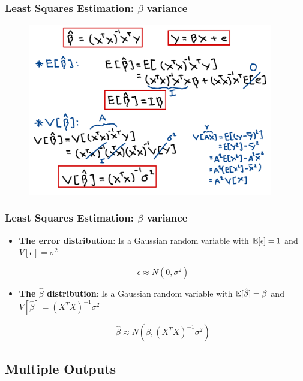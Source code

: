 \begin{frame}
    \frametitle{Least Squares Estimation: $\beta$ variance}
    \begin{figure}
        \centering
        \includegraphics[width=0.95\textwidth]{sections/least_squares_estimation/figures/beta_variance_prove.pdf}
    \end{figure}
\end{frame}


\begin{frame}
    \frametitle{Least Squares Estimation: $\beta$ variance}

    \begin{itemize}

        \item \textbf{The error distribution}: Is a Gaussian random variable with
        $\operatorname*{\mathbb{E}}[\epsilon]=1$ and $V[\epsilon]=\sigma^2$

        $$\epsilon \approx N(0, \sigma^2)$$

        \item \textbf{The  $\hat{\beta}$ distribution}: Is a Gaussian random variable
        with $\operatorname*{\mathbb{E}}[\hat{\beta}]=\beta$ and $V[\hat{\beta}]=(X^TX)^{-1}\sigma^2$

        $$\hat{\beta} \approx N(\beta, (X^TX)^{-1}\sigma^2)$$

    \end{itemize}

\end{frame}


\subsection{Multiple Outputs}


